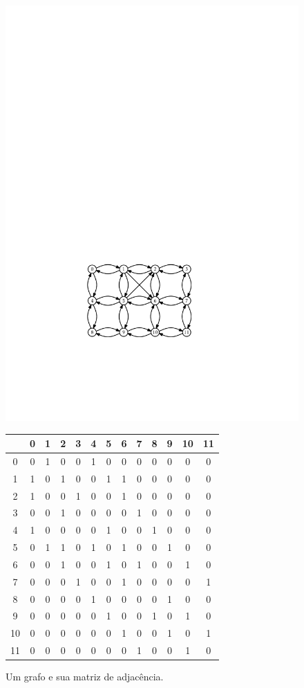 \begin{figure}
	\begin{center}
		\includegraphics[scale=0.90909]{figs/graph} \\[3ex]
		\begin{tabular}{c|cccccccccccc}
			&0&1&2&3&4&5&6&7&8&9&10&11 \\\hline
			0&0&1&0&0&1&0&0&0&0&0&0 &0\\
			1&1&0&1&0&0&1&1&0&0&0&0 &0\\
			2&1&0&0&1&0&0&1&0&0&0&0 &0\\
			3&0&0&1&0&0&0&0&1&0&0&0 &0\\
			4&1&0&0&0&0&1&0&0&1&0&0 &0\\
			5&0&1&1&0&1&0&1&0&0&1&0 &0\\
			6&0&0&1&0&0&1&0&1&0&0&1 &0\\
			7&0&0&0&1&0&0&1&0&0&0&0 &1\\
			8&0&0&0&0&1&0&0&0&0&1&0 &0\\
			9&0&0&0&0&0&1&0&0&1&0&1 &0\\
			10&0&0&0&0&0&0&1&0&0&1&0 &1\\
			11&0&0&0&0&0&0&0&1&0&0&1 &0\\
		\end{tabular} 
	\end{center}
	\caption{Um grafo e sua matriz de adjacência.}
\end{figure}


